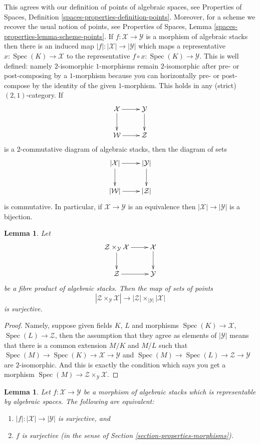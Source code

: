 \documentclass{stacks-project}
\theoremstyle{plain}
\newtheorem{lemma}[subsection]{Lemma}
\theoremstyle{definition}
\theoremstyle{remark}
\numberwithin{equation}{subsection}
\def\Spec{\mathop{\mathrm{Spec}}}
\begin{document}
\noindent
This agrees with our definition of points of algebraic spaces, see
Properties of Spaces, Definition \ref{spaces-properties-definition-points}.
Moreover, for a scheme we recover the usual notion of points, see
Properties of Spaces, Lemma \ref{spaces-properties-lemma-scheme-points}.
If $f : \mathcal{X} \to \mathcal{Y}$ is a morphism of algebraic stacks
then there is an induced map $|f| : |\mathcal{X}| \to |\mathcal{Y}|$ which
maps a representative $x : \Spec(K) \to \mathcal{X}$ to the
representative $f \circ x : \Spec(K) \to \mathcal{Y}$. This is
well defined: namely $2$-isomorphic $1$-morphisms remain $2$-isomorphic after
pre- or post-composing by a $1$-morphism because you can horizontally
pre- or post-compose by the identity of the given $1$-morphism. This holds
in any (strict) $(2, 1)$-category. If
$$
\xymatrix{
\mathcal{X} \ar[d] \ar[r] & \mathcal{Y} \ar[d] \\
\mathcal{W} \ar[r] & \mathcal{Z}
}
$$
is a $2$-commutative diagram of algebraic stacks, then the diagram
of sets
$$
\xymatrix{
|\mathcal{X}| \ar[d] \ar[r] & |\mathcal{Y}| \ar[d] \\
|\mathcal{W}| \ar[r] & |\mathcal{Z}|
}
$$
is commutative.
In particular, if $\mathcal{X} \to \mathcal{Y}$ is an equivalence
then $|\mathcal{X}| \to |\mathcal{Y}|$ is a bijection.

\begin{lemma}
\label{lemma-points-cartesian}
Let
$$
\xymatrix{
\mathcal{Z} \times_\mathcal{Y} \mathcal{X} \ar[r] \ar[d] &
\mathcal{X} \ar[d] \\
\mathcal{Z} \ar[r] & \mathcal{Y}
}
$$
be a fibre product of algebraic stacks. Then the map of sets
of points
$$
|\mathcal{Z} \times_\mathcal{Y} \mathcal{X}|
\longrightarrow
|\mathcal{Z}| \times_{|\mathcal{Y}|} |\mathcal{X}|
$$
is surjective.
\end{lemma}

\begin{proof}
Namely, suppose given fields $K$, $L$ and morphisms
$\Spec(K) \to \mathcal{X}$, $\Spec(L) \to \mathcal{Z}$,
then the assumption that they agree as elements of $|\mathcal{Y}|$ means that
there is a common extension $M/K$ and $M/L$
such that
$\Spec(M) \to \Spec(K) \to \mathcal{X} \to \mathcal{Y}$ and
$\Spec(M) \to \Spec(L) \to \mathcal{Z} \to \mathcal{Y}$
are $2$-isomorphic. And this is exactly the condition which says you get a
morphism $\Spec(M) \to \mathcal{Z} \times_\mathcal{Y} \mathcal{X}$.
\end{proof}

\begin{lemma}
\label{lemma-characterize-surjective}
Let $f : \mathcal{X} \to \mathcal{Y}$ be a morphism of algebraic stacks
which is representable by algebraic spaces. The following are equivalent:
\begin{enumerate}
\item $|f| : |\mathcal{X}| \to |\mathcal{Y}|$ is surjective, and
\item $f$ is surjective
(in the sense of Section \ref{section-properties-morphisms}).
\end{enumerate}
\end{lemma}
\end{document}
